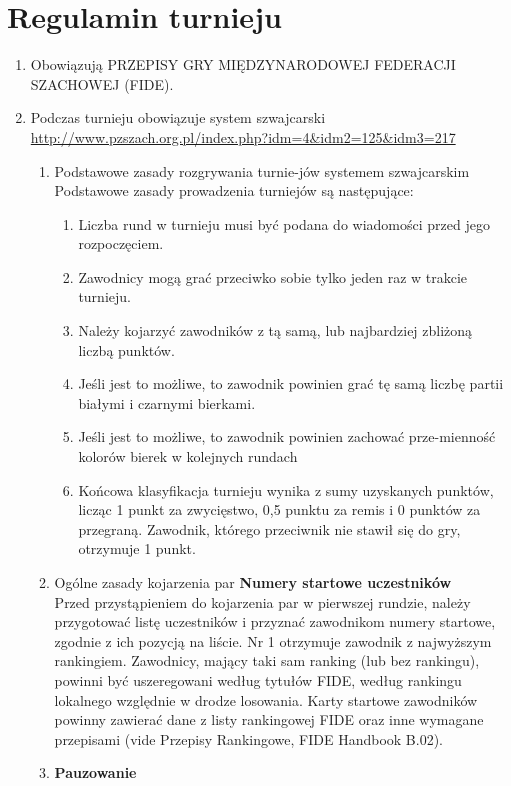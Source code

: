 \section{Regulamin turnieju}
\begin{enumerate}
	\item Obowiązują PRZEPISY GRY MIĘDZYNARODOWEJ FEDERACJI SZACHOWEJ (FIDE).
	\item Podczas turnieju obowiązuje system szwajcarski \url{http://www.pzszach.org.pl/index.php?idm=4&idm2=125&idm3=217}
	\begin{enumerate}
		\item Podstawowe zasady rozgrywania turnie-jów systemem szwajcarskim
		\\Podstawowe zasady prowadzenia turniejów są następujące:
\begin{enumerate}
\item Liczba rund w turnieju musi być podana do wiadomości przed jego rozpoczęciem.
\item Zawodnicy mogą grać przeciwko sobie tylko jeden raz w trakcie turnieju.
\item Należy kojarzyć zawodników z tą samą, lub najbardziej zbliżoną liczbą punktów. 
\item Jeśli jest to możliwe, to zawodnik powinien grać tę samą liczbę partii białymi i czarnymi bierkami. 
\item Jeśli jest to możliwe, to zawodnik powinien zachować prze-mienność kolorów bierek w kolejnych rundach
\item Końcowa klasyfikacja turnieju wynika z sumy uzyskanych punktów, licząc 1 punkt za zwycięstwo, 0,5 punktu za remis i 0 punktów za przegraną. Zawodnik, którego przeciwnik nie stawił się do gry, otrzymuje 1 punkt.
\end{enumerate}
\item Ogólne zasady kojarzenia par
\textbf{Numery startowe uczestników}\\
Przed przystąpieniem do kojarzenia par w pierwszej rundzie, należy przygotować listę uczestników i przyznać zawodnikom numery startowe, zgodnie z ich pozycją na liście. Nr 1 otrzymuje zawodnik z najwyższym rankingiem. Zawodnicy, mający taki sam ranking (lub bez rankingu), powinni być uszeregowani według tytułów FIDE, według rankingu lokalnego względnie w drodze losowania. Karty startowe zawodników powinny zawierać dane z listy rankingowej FIDE oraz inne wymagane przepisami (vide Przepisy Rankingowe, FIDE Handbook B.02).
\item \textbf{Pauzowanie}
\begin{enumerate}

\end{enumerate}
\end{enumerate}
\end{enumerate}
